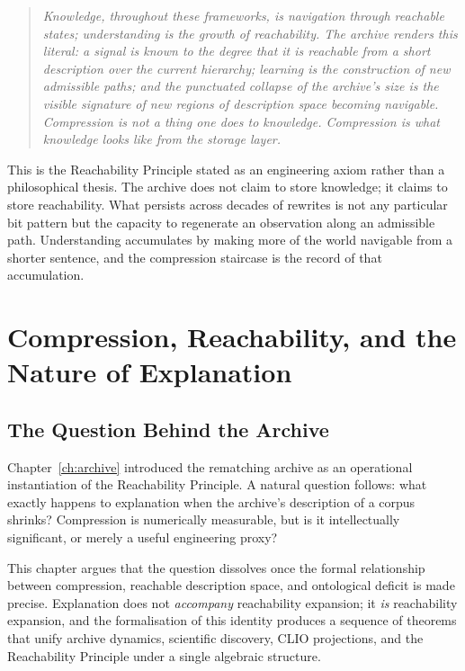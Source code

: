\documentclass[11pt, a4paper, openany]{book}
\theoremstyle{plain}
\theoremstyle{definition}
\theoremstyle{remark}
\begin{document}
\begin{quote}
  \itshape
  Knowledge, throughout these frameworks, is navigation through reachable states;
  understanding is the growth of reachability.
  The archive renders this literal: a signal is known to the degree that it is
  reachable from a short description over the current hierarchy;
  learning is the construction of new admissible paths;
  and the punctuated collapse of the archive's size is the visible signature
  of new regions of description space becoming navigable.
  Compression is not a thing one does to knowledge.
  Compression is what knowledge looks like from the storage layer.
\end{quote}

This is the Reachability Principle stated as an engineering axiom rather than
a philosophical thesis.
The archive does not claim to store knowledge; it claims to store reachability.
What persists across decades of rewrites is not any particular bit pattern
but the capacity to regenerate an observation along an admissible path.
Understanding accumulates by making more of the world navigable from a shorter sentence,
and the compression staircase is the record of that accumulation.

\chapter{Compression, Reachability, and the Nature of Explanation}
\label{ch:explanation}

\section{The Question Behind the Archive}

Chapter~\ref{ch:archive} introduced the rematching archive as an operational
instantiation of the Reachability Principle.
A natural question follows: what exactly happens to explanation when the
archive's description of a corpus shrinks?
Compression is numerically measurable, but is it intellectually significant,
or merely a useful engineering proxy?

This chapter argues that the question dissolves once the formal relationship
between compression, reachable description space, and ontological deficit
is made precise.
Explanation does not \emph{accompany} reachability expansion; it \emph{is}
reachability expansion, and the formalisation of this identity produces
a sequence of theorems that unify archive dynamics, scientific discovery,
CLIO projections, and the Reachability Principle under a single algebraic
structure.
\end{document}
